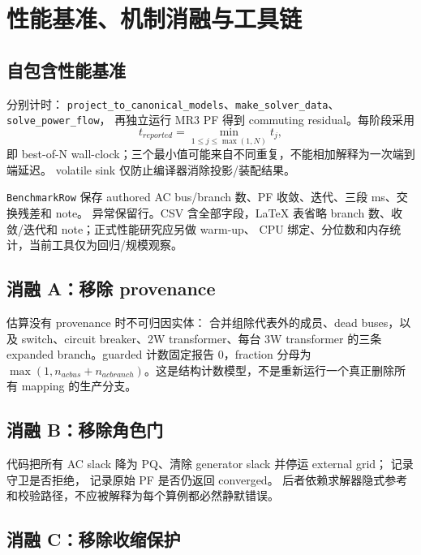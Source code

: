 \section{性能基准、机制消融与工具链}

\subsection{自包含性能基准}

 分别计时：
\texttt{project\_to\_canonical\_models}、\texttt{make\_solver\_data}、\texttt{solve\_power\_flow}，
再独立运行 MR3 PF 得到 commuting residual。每阶段采用
\begin{equation}
t_{reported}=\min_{1\le j\le\max(1,N)}t_j,
\end{equation}
即 best-of-N wall-clock；三个最小值可能来自不同重复，不能相加解释为一次端到端延迟。
volatile sink 仅防止编译器消除投影/装配结果。

\texttt{BenchmarkRow} 保存 authored AC bus/branch 数、PF 收敛、迭代、三段 ms、交换残差和 note。
异常保留行。CSV 含全部字段，LaTeX 表省略 branch 数、收敛/迭代和 note；正式性能研究应另做 warm-up、
CPU 绑定、分位数和内存统计，当前工具仅为回归/规模观察。

\subsection{消融 A：移除 provenance}

 估算没有 provenance 时不可归因实体：
合并组除代表外的成员、dead buses，以及 switch、circuit breaker、2W transformer、每台 3W transformer 的三条
expanded branch。guarded 计数固定报告 0，fraction 分母为
$\max(1,n_{acbus}+n_{acbranch})$。这是结构计数模型，不是重新运行一个真正删除所有 mapping 的生产分支。

\subsection{消融 B：移除角色门}

代码把所有 AC slack 降为 PQ、清除 generator slack 并停运 external grid；
 记录守卫是否拒绝， 记录原始 PF 是否仍返回 converged。
后者依赖求解器隐式参考和校验路径，不应被解释为每个算例都必然静默错误。

\subsection{消融 C：移除收缩保护}

